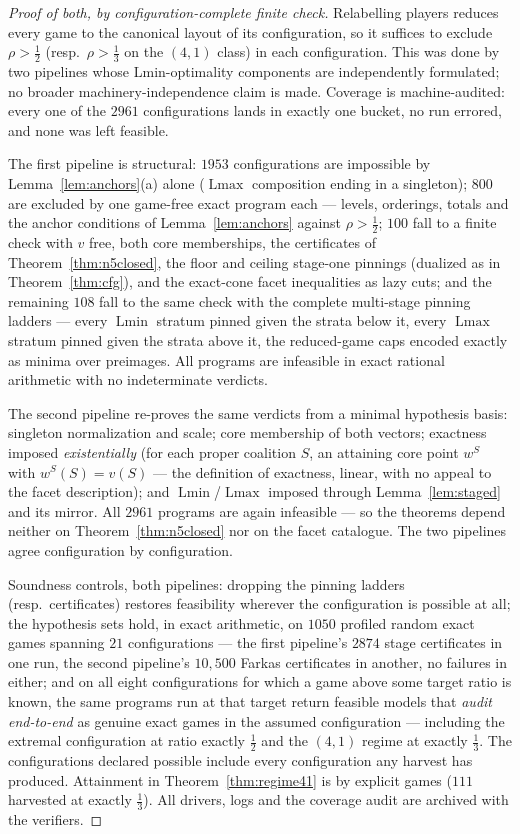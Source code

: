 \documentclass[11pt]{article}
\newcommand{\Lmin}{\operatorname{Lmin}}
\newcommand{\Lmax}{\operatorname{Lmax}}
\begin{document}
\begin{proof}[Proof of both, by configuration-complete finite check]
Relabelling players reduces every game to the canonical layout of its
configuration, so it suffices to exclude $\rho>\tfrac12$ (resp.\
$\rho>\tfrac13$ on the $(4,1)$ class) in each configuration.  This was done
by two pipelines whose Lmin-optimality components are independently
formulated; no broader machinery-independence claim is made.  Coverage is
machine-audited:
every one of the $2961$ configurations lands in exactly one bucket, no run
errored, and none was left feasible.

The first pipeline is structural: $1953$ configurations are impossible by
Lemma~\ref{lem:anchors}(a) alone ($\Lmax$ composition ending in a
singleton); $800$ are excluded by one game-free exact program each ---
levels, orderings, totals and the anchor conditions of
Lemma~\ref{lem:anchors} against $\rho>\tfrac12$; $100$ fall to a finite
check with $v$ free, both core memberships, the certificates of
Theorem~\ref{thm:n5closed}, the floor and ceiling stage-one pinnings
(dualized as in Theorem~\ref{thm:cfg}), and the exact-cone facet
inequalities as lazy cuts; and the remaining $108$ fall to the same check
with the complete multi-stage pinning ladders --- every $\Lmin$ stratum
pinned given the strata below it, every $\Lmax$ stratum pinned given the
strata above it, the reduced-game caps encoded exactly as minima over
preimages.  All programs are infeasible in exact rational arithmetic with
no indeterminate verdicts.

The second pipeline re-proves the same verdicts from a minimal hypothesis
basis: singleton normalization and scale; core membership of both vectors;
exactness imposed \emph{existentially} (for each proper coalition $S$, an
attaining core point $w^S$ with $w^S(S)=v(S)$ --- the definition of
exactness, linear, with no appeal to the facet description); and
$\Lmin$/$\Lmax$ imposed through Lemma~\ref{lem:staged} and its mirror.
All $2961$ programs are again infeasible --- so the theorems depend neither
on Theorem~\ref{thm:n5closed} nor on the facet catalogue.  The two
pipelines agree configuration by configuration.

Soundness controls, both pipelines: dropping the pinning ladders (resp.\
certificates) restores feasibility wherever the configuration is possible
at all; the hypothesis sets hold, in exact arithmetic, on $1050$ profiled
random exact games spanning $21$ configurations --- the first pipeline's
$2874$ stage certificates in one run, the second pipeline's $10{,}500$
Farkas certificates in another, no failures in either; and on all eight
configurations for which a
game above some target ratio is known, the same programs run at that
target return feasible models that \emph{audit end-to-end} as genuine
exact games in the assumed configuration --- including the extremal
configuration at ratio exactly $\tfrac12$ and the $(4,1)$ regime at
exactly $\tfrac13$.  The configurations declared possible include every
configuration any harvest has produced.  Attainment in
Theorem~\ref{thm:regime41} is by explicit games ($111$ harvested at exactly
$\tfrac13$).  All drivers, logs and the coverage audit are archived with
the verifiers.
\end{proof}
\end{document}
